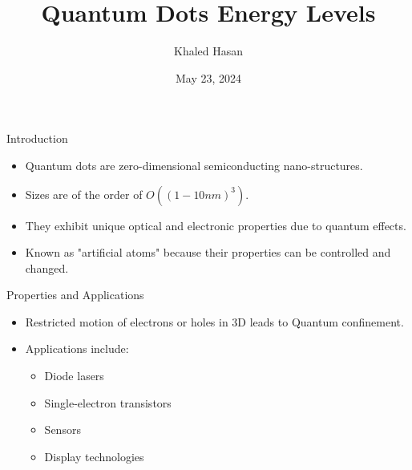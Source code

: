 \documentclass{beamer}
\title{Quantum Dots Energy Levels}
\author{Khaled Hasan}
\institute{Department of Physics, Birzeit University}
\date{May 23, 2024}
\begin{document}
\frame{\titlepage}


\begin{frame}{Introduction}
    \begin{itemize}
        \item Quantum dots are zero-dimensional semiconducting nano-structures.
        \item Sizes are of the order of \(O((1-10 nm)^3)\).
        \item They exhibit unique optical and electronic properties due to quantum effects.
        \item Known as "artificial atoms" because their properties can be controlled and changed.
    \end{itemize}
\end{frame}



\begin{frame}{Properties and Applications}
    \begin{itemize}
        \item Restricted motion of electrons or holes in 3D leads to Quantum confinement.
        \item Applications include:
        \begin{itemize}
            \item Diode lasers
            \item Single-electron transistors
            \item Sensors
            \item Display technologies
        \end{itemize}
    \end{itemize}
\end{frame}
\end{document}

